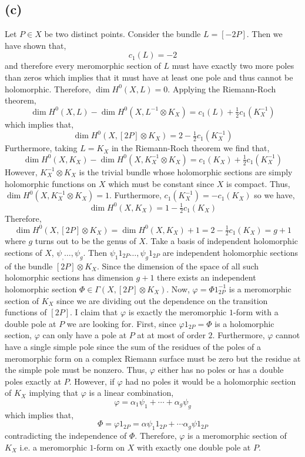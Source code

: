 \documentclass[12pt]{extarticle}
\theoremstyle{definition}
\begin{document}
\subsection*{(c)}

Let $P \in X$ be two distinct points. Consider the bundle $L = [-2 P]$. Then we have shown that,
\[ c_1(L) = -2 \]
and therefore every meromorphic section of $L$ must have exactly two more poles than zeros which implies that it must have at least one pole and thus cannot be holomorphic. Therefore, $\dim{H^0(X, L)} = 0$. Applying the Riemann-Roch theorem,
\[ \dim{H^0(X, L)} - \dim{H^0(X, L^{-1} \otimes K_X)} = c_1(L) + \tfrac{1}{2} c_1(K_X^{-1}) \]
which implies that,
\[ \dim{H^0(X, [2 P] \otimes K_X)} = 2 - \tfrac{1}{2} c_1(K_X^{-1}) \] 
Furthermore, taking $L = K_X$ in the Riemann-Roch theorem we find that,
\[ \dim{H^0(X, K_X)} - \dim{H^0(X, K_X^{-1} \otimes K_X)} = c_1(K_X) + \tfrac{1}{2} c_1(K_X^{-1}) \]
However, $K_X^{-1} \otimes K_X$ is the trivial bundle whose holomorphic sections are simply holomorphic functions on $X$ which must be constant since $X$ is compact. Thus, $\dim{H^0(X, K_X^{-1} \otimes K_X)} = 1$. Furthermore, $c_1(K_X^{-1}) = - c_1(K_X)$ so we have,
\[ 
\dim{H^{0}(X, K_X)} = 1 - \tfrac{1}{2} c_1(K_X) \]
Therefore,
\[ \dim{H^0(X, [2 P] \otimes K_X)} = \dim{H^{0}(X, K_X)} + 1 = 2 - \tfrac{1}{2} c_1(K_X) = g + 1
\]
where $g$ turns out to be the genus of $X$. Take a basis of independent holomorphic sections of $X$, $\psi_, \dots, \psi_g$. Then $\psi_1 1_{2P} \dots, \psi_g  1_{2P}$ are independent holomorphic sections of the bundle $[2 P] \otimes K_X$. Since the dimension of the space of all such holomorphic sections has dimension $g + 1$ there exists an independent holomorphic section $\Phi \in \Gamma(X, [2 P] \otimes K_X)$. Now, $\varphi = \Phi 1_{2P}^{-1} $ is a meromorphic section of $K_X$ since we are dividing out the dependence on the transition functions of $[2 P]$. I claim that $\varphi$ is exactly the meromorphic $1$-form with a double pole at $P$ we are looking for. First, since $\varphi 1_{2 P} = \Phi$ is a holomorphic section, $\varphi$ can only have a pole at $P$ at at most of order $2$.  Furthermore, $\varphi$ cannot have a single simple pole since the sum of the residues of the poles of a meromorphic form on a complex Riemann surface must be zero but the residue at the simple pole must be nonzero. Thus, $\varphi$ either has no poles or has a double poles exactly at $P$. However, if $\varphi$ had no poles it would be a holomorphic section of $K_X$ implying that $\varphi$ is a linear combination,
\[ \varphi = \alpha_1 \psi_1 + \cdots + \alpha_g \psi_g \]
which implies that,
\[ \Phi = \varphi 1_{2P} = \alpha \psi_1 1_{2P} + \cdots \alpha_g \psi 1_{2 P} \]
contradicting the independence of $\Phi$. Therefore, $\varphi$ is a meromorphic section of $K_X$ i.e. a meromorphic $1$-form on $X$ with exactly one double pole at $P$. 
\end{document}

